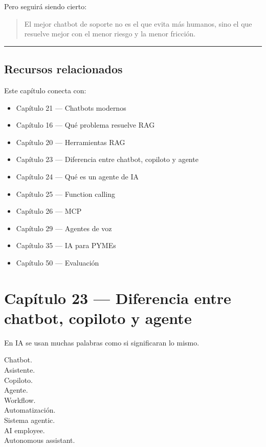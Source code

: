 Pero seguirá siendo cierto:

\begin{quote}
El mejor chatbot de soporte no es el que evita más humanos, sino el que
resuelve mejor con el menor riesgo y la menor fricción.
\end{quote}

\begin{center}\rule{0.5\linewidth}{0.5pt}\end{center}

\section{Recursos relacionados}\label{recursos-relacionados-21}

Este capítulo conecta con:

\begin{itemize}
\tightlist
\item
  Capítulo 21 --- Chatbots modernos
\item
  Capítulo 16 --- Qué problema resuelve RAG
\item
  Capítulo 20 --- Herramientas RAG
\item
  Capítulo 23 --- Diferencia entre chatbot, copiloto y agente
\item
  Capítulo 24 --- Qué es un agente de IA
\item
  Capítulo 25 --- Function calling
\item
  Capítulo 26 --- MCP
\item
  Capítulo 29 --- Agentes de voz
\item
  Capítulo 35 --- IA para PYMEs
\item
  Capítulo 50 --- Evaluación
\end{itemize}

\newpage

\chapter{Capítulo 23 --- Diferencia entre chatbot, copiloto y
agente}\label{capuxedtulo-23-diferencia-entre-chatbot-copiloto-y-agente}

En IA se usan muchas palabras como si significaran lo mismo.

Chatbot.\\
Asistente.\\
Copiloto.\\
Agente.\\
Workflow.\\
Automatización.\\
Sistema agentic.\\
AI employee.\\
Autonomous assistant.

